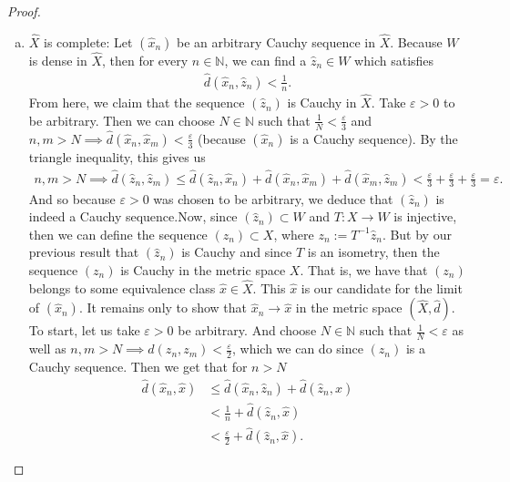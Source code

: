 \documentclass[11pt]{article}
\theoremstyle{mystyle}
\begin{document}
\begin{proof}
\begin{enumerate}[(a)]
\item $\hat{X}$ is complete:\newline
Let $(\hat{x}_n)$ be an arbitrary Cauchy sequence in $\hat{X}$. Because $W$ is dense in $\hat{X}$, then for every $n \in \mathbb{N}$, we can find a $\hat{z}_n \in W$ which satisfies
\begin{align*}
    \hat{d}(\hat{x}_n, \hat{z}_n) < \frac{1}{n}.
\end{align*}
From here, we claim that the sequence $(\hat{z}_n)$ is Cauchy in $\hat{X}$. Take $\varepsilon > 0$ to be arbitrary. Then we can choose $N \in \mathbb{N}$ such that $\frac{1}{N} < \frac{\varepsilon}{3}$ and $n, m > N \implies \hat{d}(\hat{x}_n, \hat{x}_m) < \frac{\varepsilon}{3}$ (because $(\hat{x}_n)$ is a Cauchy sequence). By the triangle inequality, this gives us 
\begin{align*}
    n, m > N \implies \hat{d}(\hat{z}_n, \hat{z}_m) \leq \hat{d}(\hat{z}_n, \hat{x}_n) + \hat{d}(\hat{x}_n, \hat{x}_m) + \hat{d}(\hat{x}_m, \hat{z}_m) < \frac{\varepsilon}{3} + \frac{\varepsilon}{3} + \frac{\varepsilon}{3} = \varepsilon.
\end{align*}
And so because $\varepsilon > 0$ was chosen to be arbitrary, we deduce that $(\hat{z}_n)$ is indeed a Cauchy sequence.\newline Now, since $(\hat{z}_n) \subset W$ and $T: X \longrightarrow W$ is injective, then we can define the sequence $(z_n) \subset X$, where $z_n := T^{-1}\hat{z}_n$. But by our previous result that $(\hat{z}_n)$ is Cauchy and since $T$ is an isometry, then the sequence $(z_n)$ is Cauchy in the metric space $X$. That is, we have that $(z_n)$ belongs to some equivalence class $\hat{x} \in \hat{X}$. This $\hat{x}$ is our candidate for the limit of $(\hat{x}_n)$.\newline
It remains only to show that $\hat{x}_n \longrightarrow \hat{x}$ in the metric space $(\hat{X}, \hat{d})$. To start, let us take $\varepsilon > 0$ be arbitrary. And choose $N \in \mathbb{N}$ such that $\frac{1}{N} < \varepsilon$ as well as $n, m > N \implies d(z_n, z_m) < \frac{\varepsilon}{2}$, which we can do since $(z_n)$ is a Cauchy sequence. Then we get that for $n > N$
\begin{align*}
    \hat{d}(\hat{x}_n, \hat{x}) &\leq \hat{d}(\hat{x}_n, \hat{z}_n) + \hat{d}(\hat{z}_n, \hat{x})\\
    &< \frac{1}{n} + \hat{d}(\hat{z}_n, \hat{x})\\
    &< \frac{\varepsilon}{2} + \hat{d}(\hat{z}_n, \hat{x}).
\end{align*}

\end{enumerate}
\end{proof}
\end{document}

